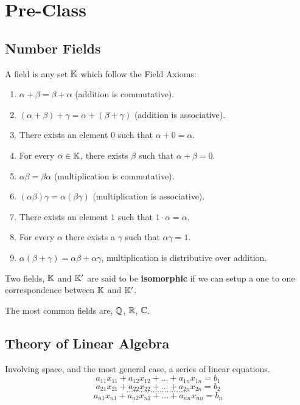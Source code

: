\chapter{Pre-Class}
\section{Number Fields}
\begin{defn}
A field is any set $\mathbb{K}$ which follow the Field Axioms:
\begin{enumerate}
   \item $\alpha + \beta = \beta + \alpha$ (addition is commutative).
   \item $(\alpha + \beta) + \gamma =\alpha + (\beta + \gamma)$ (addition is associative).
   \item There exists an element $0$ such that $\alpha + 0 = \alpha$.
   \item For every $\alpha \in \mathbb{K}$, there exists $\beta$ such that $\alpha + \beta = 0$.
   \item $\alpha\beta = \beta\alpha$ (multiplication is commutative).
   \item $(\alpha\beta)\gamma = \alpha(\beta\gamma)$ (multiplication is associative).
   \item There exists an element $1$ such that $1\cdot \alpha = \alpha$.
   \item For every $\alpha$ there exists a $\gamma$ such that $\alpha\gamma = 1$.
   \item $\alpha(\beta + \gamma) = \alpha\beta + \alpha\gamma$, multiplication is distributive over addition.
\end{enumerate}
\end{defn}
\begin{defn}
Two fields, $\mathbb{K}$ and $\mathbb{K}'$ are said to be \textbf{isomorphic} if we can setup a one to one correspondence between $\mathbb{K}$ and $\mathbb{K}'$.
\end{defn}
The most common fields are, $\mathbb{Q}$, $\mathbb{R}$, $\mathbb{C}$.

\section{Theory of Linear Algebra}
Involving space, and the most general case, a series of linear equations.
\[a_{11}x_{11} + a_{12}x_{12} + \dots + a_{1n}x_{1n} = b_1\]
\[a_{21}x_{21} + a_{22}x_{22} + \dots + a_{2n}x_{2n} = b_2\]
\[\dots \dots \dots \dots \dots \dots \dots \dots \dots\]
\[a_{n1}x_{n1} + a_{n2}x_{n2} + \dots + a_{nn}x_{nn} = b_n\]

